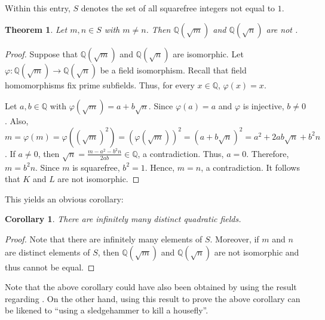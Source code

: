 \documentclass[12pt]{article}
\newtheorem*{thm*}{Theorem}
\newtheorem*{cor*}{Corollary}
\begin{document}

Within this entry, $S$ denotes the set of all squarefree integers not equal to $1$.

\begin{thm*}
Let $m,n \in S$ with $m \neq n$.  Then $\mathbb{Q}(\sqrt{m})$ and $\mathbb{Q}(\sqrt{n})$ are not .
\end{thm*}

\begin{proof}
Suppose that $\mathbb{Q}(\sqrt{m})$ and $\mathbb{Q}(\sqrt{n})$ are isomorphic.  Let $\varphi \colon \mathbb{Q}(\sqrt{m}) \to \mathbb{Q}(\sqrt{n})$ be a field isomorphism.  Recall that field homomorphisms fix prime subfields.  Thus, for every $x \in \mathbb{Q}$, $\varphi(x)=x$.

Let $a,b \in \mathbb{Q}$ with $\varphi(\sqrt{m})=a+b\sqrt{n}$.  Since $\varphi(a)=a$ and $\varphi$ is injective, $b \neq 0$.  Also, $m=\varphi(m)=\varphi((\sqrt{m})^2)=(\varphi(\sqrt{m}))^2=(a+b\sqrt{n})^2=a^2+2ab\sqrt{n}+b^2n$.  If $a \neq 0$, then $\displaystyle \sqrt{n}=\frac{m-a^2-b^2n}{2ab} \in \mathbb{Q}$, a contradiction.  Thus, $a=0$.  Therefore, $m=b^2n$.  Since $m$ is squarefree, $b^2=1$.  Hence, $m=n$, a contradiction.  It follows that $K$ and $L$ are not isomorphic.
\end{proof}

This yields an obvious corollary:

\begin{cor*}
There are infinitely many distinct quadratic fields.
\end{cor*}

\begin{proof}
Note that there are infinitely many elements of $S$.  Moreover, if $m$ and $n$ are distinct elements of $S$, then $\mathbb{Q}(\sqrt{m})$ and $\mathbb{Q}(\sqrt{n})$ are not isomorphic and thus cannot be equal.
\end{proof}

Note that the above corollary could have also been obtained by using the result regarding .  On the other hand, using this result to prove the above corollary can be likened to ``using a sledgehammer to kill a housefly''.
\end{document}
